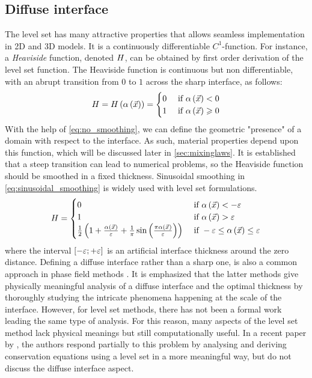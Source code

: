 \subsection{Diffuse interface}
\label{sec:heaviside}
The level set has many attractive properties that allows seamless implementation in 2D and 3D models. 
It is a continuously differentiable $C^1$-function. For instance, a \emph{Heaviside} function, 
denoted $H$, can be obtained by first order derivation of the level set function. The 
Heaviside function is continuous but non differentiable, with an abrupt transition from $0$ to $1$ 
across the sharp interface, as follows:
\begin{align}
\label{eq:no_smoothing}
H = H \left( \alpha \left( \vec{x} \right) \right) = 
\begin{cases}
	0  & \text{ if } \alpha \left( \vec{x} \right) < 0 \\
    1  & \text{ if } \alpha \left( \vec{x} \right) \geqslant 0 \\  
\end{cases}
\end{align}
With the help of \cref{eq:no_smoothing}, we can define the geometric 
"presence" of a domain with respect to the interface. As such, material properties 
depend upon this function, which will be discussed later in \cref{sec:mixinglaws}.
It is established that a steep transition can lead to numerical problems, 
so the Heaviside function should be smoothed in a fixed thickness.
Sinusoidal smoothing in \cref{eq:sinusoidal_smoothing} is widely used with level set formulations.
\begin{align}
\label{eq:sinusoidal_smoothing}
H= 
\begin{cases}
	0  & \text{ if } \alpha \left( \vec{x} \right) < -\varepsilon \\
    1  & \text{ if } \alpha \left( \vec{x} \right) > \varepsilon \\  
    \frac{1}{2} \left( 1+ \frac{\alpha \left( \vec{x} \right)}{\varepsilon} 
    + \frac{1}{\pi}\sin \left( \frac{\pi \alpha \left( \vec{x} \right)}{\varepsilon } \right)  \right) & \text{ if } - \varepsilon \leq \alpha \left( \vec{x} \right) \leq \varepsilon
\end{cases}
\end{align}
where the interval $\left[ -\varepsilon; +\varepsilon \right]$ is an artificial interface thickness around the zero distance.
Defining a diffuse interface rather than a sharp one, is also a common approach 
in phase field methods \citep{beckermann_modeling_1999,sun_diffuse_2004}.
It is emphasized that the latter methods give physically meaningful 
analysis of a diffuse interface and the optimal thickness by thoroughly studying the 
intricate phenomena happening at the scale of the interface. However, for level set methods, 
there has not been a formal work leading the same type of analysis. For this reason, 
many aspects of the level set method lack physical meanings but still computationally useful.
In a recent paper by \citet{gada_derivation_2009}, the authors respond partially to this problem 
by analysing and deriving conservation equations using a level set in a more meaningful way, but 
do not discuss the diffuse interface aspect.


